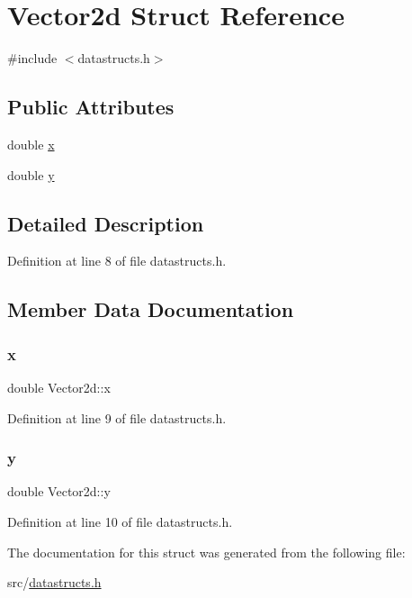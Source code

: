 \hypertarget{struct_vector2d}{}\section{Vector2d Struct Reference}
\label{struct_vector2d}


{\ttfamily \#include $<$datastructs.\+h$>$}

\subsection*{Public Attributes}
\begin{DoxyCompactItemize}
\item 
double \mbox{\hyperlink{struct_vector2d_a151efa5a874304b46327130770327810}{x}}
\item 
double \mbox{\hyperlink{struct_vector2d_aa61b1cb70cc682e1bbc29a7b2f72681e}{y}}
\end{DoxyCompactItemize}


\subsection{Detailed Description}


Definition at line 8 of file datastructs.\+h.



\subsection{Member Data Documentation}
\mbox{\label{struct_vector2d_a151efa5a874304b46327130770327810}} 
\subsubsection{\texorpdfstring{x}{x}}
{\footnotesize\ttfamily double Vector2d\+::x}



Definition at line 9 of file datastructs.\+h.

\mbox{\label{struct_vector2d_aa61b1cb70cc682e1bbc29a7b2f72681e}} 
\subsubsection{\texorpdfstring{y}{y}}
{\footnotesize\ttfamily double Vector2d\+::y}



Definition at line 10 of file datastructs.\+h.



The documentation for this struct was generated from the following file\+:\begin{DoxyCompactItemize}
\item 
src/\mbox{\hyperlink{datastructs_8h}{datastructs.\+h}}\end{DoxyCompactItemize}
